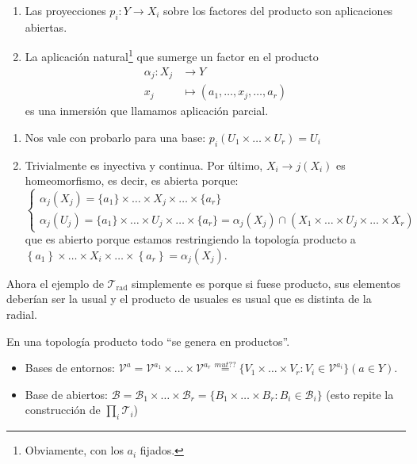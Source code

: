 \begin{prop}
\begin{enumerate}
    \item Las proyecciones $p_i: Y \rightarrow X_i$ sobre los factores del producto son aplicaciones abiertas. 
    \item La aplicación natural\footnote{Obviamente, con los $a_i$ fijados.} que sumerge un factor en el producto 
	\begin{align*}
	 \alpha_j : X_j &\longrightarrow Y \\
	 x_j &\longmapsto \left( a_1, \ldots, x_j, \ldots, a_r \right)	
	\end{align*}	    
     es una inmersión que llamamos aplicación parcial.
\end{enumerate}
\end{prop}
\begin{demo}
\begin{enumerate}
    \item Nos vale con probarlo para una base: $p_i\left( U_1 \times \ldots \times U_r \right) = U_i$ 
    \item Trivialmente es inyectiva y continua. Por último, $X_i \rightarrow j\left( X_i \right)$ es homeomorfismo, es decir, es abierta porque:
    \[
    \begin{cases}
        \alpha_j\left( X_j \right) = \{a_1\} \times \ldots \times X_j \times \ldots \times \{a_r\} \\
        \alpha_j\left( U_j \right) = \{a_1\} \times \ldots \times U_j \times \ldots \times \{a_r\} = \alpha_j\left( X_j \right) \cap \left( X_1 \times \ldots \times U_j \times \ldots \times X_r \right) 
    \end{cases}
    \]
    que es abierto porque estamos restringiendo la topología producto a $\left\{ a_1 \right\} \times \ldots \times X_i \times \ldots \times \left\{ a_r \right\} = \alpha_j\left( X_j \right)$.
\end{enumerate}
\end{demo}

\begin{ej}
Ahora el ejemplo de $\mathcal{T}_{\text{rad}}$ simplemente es porque si fuese producto, sus elementos deberían ser la usual y el producto de usuales es usual que es distinta de la radial.
\end{ej}

\begin{obs}
En una topología producto todo ``se genera en productos''.
\end{obs}
\begin{ej}
\begin{itemize}
    \item Bases de entornos: $\mathcal{V}^a = \mathcal{V}^{a_1} \times \ldots \times \mathcal{V}^{a_r} \stackrel{mut??}{=} \{V_1 \times \ldots \times V_r: V_i \in \mathcal{V}^{a_i}\} \left( a \in Y \right)$.
    \item Base de abiertos: $\mathcal{B} = \mathcal{B}_1 \times \ldots \times \mathcal{B}_r = \{B_1 \times \ldots \times B_r: B_i \in \mathcal{B}_i\}$ (esto repite la construcción de $\prod_{i} \mathcal{T}_i$)
\end{itemize}
\end{ej}


